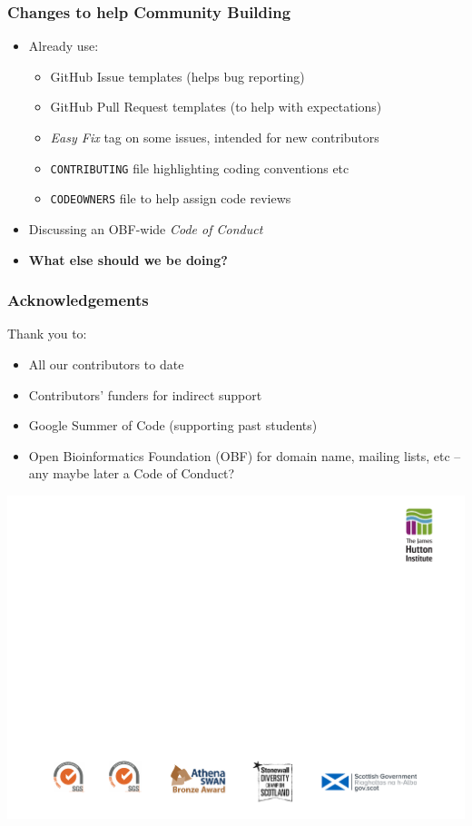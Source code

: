 \begin{frame}
\frametitle{Changes to help Community Building}
\begin{itemize}
\item Already use:
   \begin{itemize}
   \item GitHub Issue templates (helps bug reporting)
   \item GitHub Pull Request templates (to help with expectations)
   \item \textit{Easy Fix} tag on some issues, intended for new contributors
   \item \texttt{CONTRIBUTING} file highlighting coding conventions etc
   \item \texttt{CODEOWNERS} file to help assign code reviews
   \end{itemize}
\item Discussing an OBF-wide \textit{Code of Conduct}
\item \textbf{What else should we be doing?}
\end{itemize}
\end{frame}


\begin{frame}
\frametitle{Acknowledgements}
Thank you to:
\begin{itemize}
    \item All our contributors to date
    \item Contributors' funders for indirect support
    \item Google Summer of Code (supporting past students)
    \item Open Bioinformatics Foundation (OBF) for domain name, mailing lists, etc -- any maybe later a Code of Conduct?
\end{itemize}

\vspace{1.1cm}
\center\includegraphics[width=0.9\paperwidth]{../images/Hutton-thanks-banner}
\end{frame}


